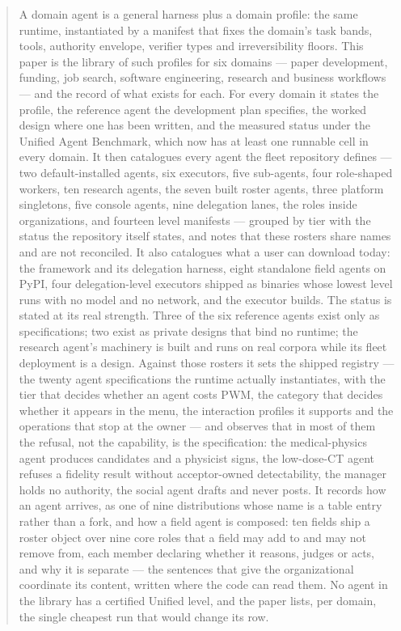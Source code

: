 \begin{abstract}
A domain agent is a general harness plus a domain profile: the same runtime, instantiated by a manifest that fixes the domain's task bands, tools, authority envelope, verifier types and irreversibility floors. This paper is the library of such profiles for six domains --- paper development, funding, job search, software engineering, research and business workflows --- and the record of what exists for each. For every domain it states the profile, the reference agent the development plan specifies, the worked design where one has been written, and the measured status under the Unified Agent Benchmark, which now has at least one runnable cell in every domain. It then catalogues every agent the fleet repository defines --- two default-installed agents, six executors, five sub-agents, four role-shaped workers, ten research agents, the seven built roster agents, three platform singletons, five console agents, nine delegation lanes, the roles inside organizations, and fourteen level manifests --- grouped by tier with the status the repository itself states, and notes that these rosters share names and are not reconciled. It also catalogues what a user can download today: the framework and its delegation harness, eight standalone field agents on PyPI, four delegation-level executors shipped as binaries whose lowest level runs with no model and no network, and the executor builds. The status is stated at its real strength. Three of the six reference agents exist only as specifications; two exist as private designs that bind no runtime; the research agent's machinery is built and runs on real corpora while its fleet deployment is a design. Against those rosters it sets the shipped registry --- the twenty agent specifications the runtime actually instantiates, with the tier that decides whether an agent costs PWM, the category that decides whether it appears in the menu, the interaction profiles it supports and the operations that stop at the owner --- and observes that in most of them the refusal, not the capability, is the specification: the medical-physics agent produces candidates and a physicist signs, the low-dose-CT agent refuses a fidelity result without acceptor-owned detectability, the manager holds no authority, the social agent drafts and never posts. It records how an agent arrives, as one of nine distributions whose name is a table entry rather than a fork, and how a field agent is composed: ten fields ship a roster object over nine core roles that a field may add to and may not remove from, each member declaring whether it reasons, judges or acts, and why it is separate --- the sentences that give the organizational coordinate its content, written where the code can read them. No agent in the library has a certified Unified level, and the paper lists, per domain, the single cheapest run that would change its row.
\end{abstract}

